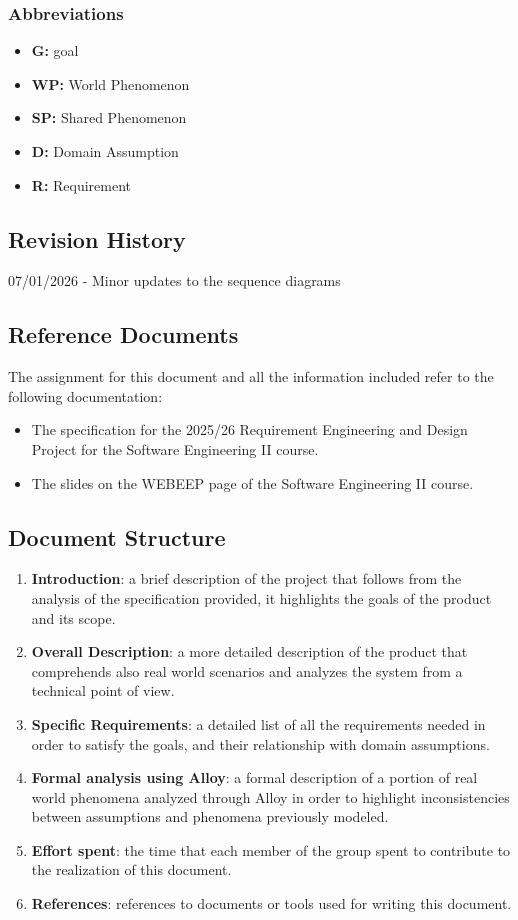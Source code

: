 \subsubsection{Abbreviations}
\begin{itemize}
    \item \textbf{G:} goal
    \item \textbf{WP:} World Phenomenon
    \item \textbf{SP:} Shared Phenomenon
    \item \textbf{D:} Domain Assumption
    \item \textbf{R:} Requirement
\end{itemize}
\subsection{Revision History}
 07/01/2026 - Minor updates to the sequence diagrams
\subsection{Reference Documents}
The assignment for this document and all the information included refer to the following documentation:
\begin{itemize}
    \item The specification for the 2025/26 Requirement Engineering and Design Project for the Software Engineering II course.
    \item The slides on the WEBEEP page of the Software Engineering II course.
\end{itemize}
\subsection{Document Structure}
\begin{enumerate}
    \item \textbf{Introduction}: a brief description of the project that follows from the analysis of the specification provided, it highlights the goals of the product and its scope.
    \item \textbf{Overall Description}: a more detailed description of the product that comprehends also real world scenarios and analyzes the system from a technical point of view.
    \item \textbf{Specific Requirements}: a detailed list of all the requirements needed in order to satisfy the goals, and their relationship with domain assumptions.
    \item \textbf{Formal analysis using Alloy}: a formal description of a portion of real world phenomena analyzed through Alloy in order to highlight inconsistencies between assumptions and phenomena previously modeled.
    \item \textbf{Effort spent}: the time that each member of the group spent to contribute to the realization of this document.
    \item \textbf{References}: references to documents or tools used for writing this document.
\end{enumerate}